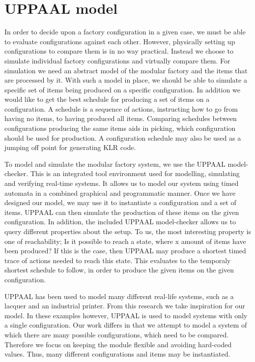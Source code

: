 \chapter{UPPAAL model}\label{ch:uppaalmodel}
In order to decide upon a factory configuration in a given case, we must be able to evaluate configurations against each other. However, physically setting up configurations to compare them is in no way practical. Instead we choose to simulate individual factory configurations and virtually compare them. For simulation we need an abstract model of the modular factory and the items that are processed by it. With such a model in place, we should be able to simulate a specific set of items being produced on a specific configuration. In addition we would like to get the best schedule for producing a set of items on a configuration. A schedule is a sequence of actions, instructing how to go from having no items, to having produced all items. Comparing schedules between configurations producing the same items aids in picking, which configuration should be used for production. A configuration schedule may also be used as a jumping off point for generating KLR code.

To model and simulate the modular factory system, we use the UPPAAL model-checker\cite{Larsen97uppaalin}. This is an integrated tool environment used for modelling, simulating and verifying real-time systems. It allows us to model our system using timed automata in a combined graphical and programmatic manner. Once we have designed our model, we may use it to instantiate a configuration and a set of items. UPPAAL can then simulate the production of these items on the given configuration. In addition, the included UPPAAL model-checker allows us to query different properties about the setup. To us, the most interesting property is one of reachability; Is it possible to reach a state, where x amount of items have been produced? If this is the case, then UPPAAL may produce a shortest timed trace of actions needed to reach this state. This evaluates to the temporaly shortest schedule to follow, in order to produce the given items on the given configuration.

UPPAAL has been used to model many different real-life systems, such as a lacquer\cite{so54514} and an industrial printer\cite{Igna2008}. From this research we take inspiration for our model. In these examples however, UPPAAL is used to model systems with only a single configuration. Our work differs in that we attempt to model a system of which there are many possible configurations, which need to be compared. Therefore we focus on keeping the module flexible and avoiding hard-coded values. Thus, many different configurations and items may be instantiated.

